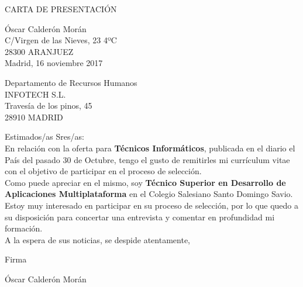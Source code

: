 \documentclass[10pt,a4paper]{article}
\begin{document}
\begin{center}
{\large CARTA DE PRESENTACIÓN}
\end{center}
\vspace{1cm} 
\begin{flushright}
Óscar Calderón Morán \\
C/Virgen de las Nieves, 23 4ºC \\
28300 ARANJUEZ \\
\medskip
Madrid, 16 noviembre 2017 \\
\end{flushright}
\medskip
\begin{flushleft}
Departamento de Recursos Humanos \\
INFOTECH S.L. \\
Travesía de los pinos, 45 \\
28910 MADRID \\ 
\end{flushleft}

\vspace{2cm}
\vspace{0.5cm}

{\normalsize Estimados/as Sres/as: \bigskip \\} 
{\normalsize En relación con la oferta para {\bf Técnicos Informáticos}, publicada en el diario el País del pasado 30 de Octubre, tengo el gusto de remitirles mi currículum vitae con el objetivo de participar en el proceso de selección. \medskip \\}
{\normalsize Como puede apreciar en el mismo, soy {\bf Técnico Superior en Desarrollo de Aplicaciones Multiplataforma} en el Colegio Salesiano Santo Domingo Savio. \medskip \\} 
{\normalsize Estoy muy interesado en participar en su proceso de selección, por lo que quedo a su disposición para concertar una entrevista y comentar en profundidad mi formación. \medskip \\} 
{\normalsize A la espera de sus noticias, se despide atentamente, \\} 
\vspace{0.5cm}
\begin{center}
\LARGE Firma
\end{center} 
\vspace{2cm}
\begin{center}
\large Óscar Calderón Morán
\end{center}
\end{document}
